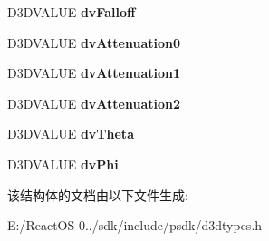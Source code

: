 \begin{DoxyCompactItemize}
D3\+D\+V\+A\+L\+UE {\bfseries dv\+Falloff}
\item 
\mbox{\label{struct___d3_d_l_i_g_h_t7_a18027be65636e756c375c1e229909d8f}} 
D3\+D\+V\+A\+L\+UE {\bfseries dv\+Attenuation0}
\item 
\mbox{\label{struct___d3_d_l_i_g_h_t7_aace215bc43c94a78b00ee8cbccee6e8d}} 
D3\+D\+V\+A\+L\+UE {\bfseries dv\+Attenuation1}
\item 
\mbox{\label{struct___d3_d_l_i_g_h_t7_a17cdf5c89e25a0f3824034992847f326}} 
D3\+D\+V\+A\+L\+UE {\bfseries dv\+Attenuation2}
\item 
\mbox{\label{struct___d3_d_l_i_g_h_t7_a78d5b858bd494bdfbd9253579d0d732f}} 
D3\+D\+V\+A\+L\+UE {\bfseries dv\+Theta}
\item 
\mbox{\label{struct___d3_d_l_i_g_h_t7_a0586b4c01ff61de7cc9d608a58f40286}} 
D3\+D\+V\+A\+L\+UE {\bfseries dv\+Phi}
\end{DoxyCompactItemize}


该结构体的文档由以下文件生成\+:\begin{DoxyCompactItemize}
\item 
E\+:/\+React\+O\+S-\/0../sdk/include/psdk/d3dtypes.\+h\end{DoxyCompactItemize}
